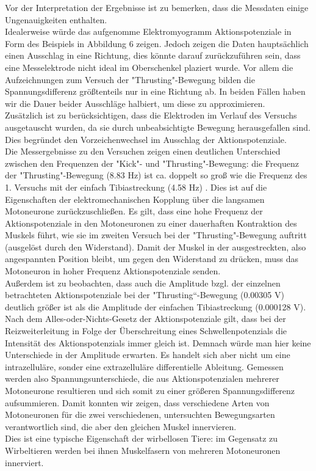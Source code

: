 Vor der Interpretation der Ergebnisse ist zu bemerken, dass die Messdaten einige Ungenauigkeiten enthalten. \\
Idealerweise würde das aufgenomme Elektromyogramm Aktionspotenziale in Form des Beispiels in Abbildung 6 zeigen. Jedoch zeigen die Daten hauptsächlich einen Ausschlag in eine Richtung, dies könnte darauf zurückzuführen sein, dass eine Messelektrode nicht ideal im Oberschenkel plaziert wurde. Vor allem die Aufzeichnungen zum Versuch der "{}Thrusting"{}-Bewegung bilden die Spannungsdifferenz größtenteils nur in eine Richtung ab. In beiden Fällen haben wir die Dauer beider Ausschläge halbiert, um diese zu approximieren. \\
Zusätzlich ist zu berücksichtigen, dass die Elektroden im Verlauf des Versuchs ausgetauscht wurden, da sie durch unbeabsichtigte Bewegung herausgefallen sind. Dies begründet den Vorzeichenwechsel im Ausschlag der Aktionspotenziale.\\

Die Messergebnisse zu den Versuchen zeigen einen deutlichen Unterschied zwischen den Frequenzen der "{}Kick"{}- und "{}Thrusting"{}-Bewegung: die Frequenz der "{}Thrusting"{}-Bewegung (8.83 Hz) ist ca. doppelt so groß wie die Frequenz des 1. Versuchs mit der einfach Tibiastreckung (4.58 Hz) . Dies ist auf die Eigenschaften der elektromechanischen Kopplung über die langsamen Motoneurone zurückzuschließen. Es gilt, dass eine hohe Frequenz der Aktionspotenziale in den Motoneuronen zu einer dauerhaften Kontraktion des Muskels führt, wie sie im zweiten Versuch bei der "{}Thrusting"{}-Bewegung auftritt (ausgelöst durch den Widerstand). Damit der Muskel in der ausgestreckten, also angespannten Position bleibt, um gegen den Widerstand zu drücken, muss das Motoneuron in hoher Frequenz Aktionspotenziale senden.  \\

Außerdem ist zu beobachten, dass auch die Amplitude bzgl. der einzelnen betrachteten Aktionspotenziale bei der "{}Thrusting“{}-Bewegung (0.00305 V) deutlich größer ist als die Amplitude der einfachen Tibiastreckung (0.000128 V). Nach dem Alles-oder-Nichts-Gesetz der Aktionspotenziale gilt, dass bei der Reizweiterleitung in Folge der Überschreitung eines Schwellenpotenzials die Intensität des Aktionspotenzials immer gleich ist. Demnach würde man hier keine Unterschiede in der Amplitude erwarten. Es handelt sich aber nicht um eine intrazelluläre, sonder eine extrazelluläre differentielle Ableitung.  Gemessen werden also Spannungsunterschiede, die aus Aktionspotenzialen mehrerer Motoneurone resultieren und sich somit zu einer größeren Spannungsdifferenz aufsummieren. Damit konnten wir zeigen, dass verschiedene Arten von Motoneuronen für die zwei verschiedenen, untersuchten Bewegungsarten verantwortlich sind, die aber den gleichen Muskel innervieren. \\
Dies ist eine typische Eigenschaft der wirbellosen Tiere: im Gegensatz zu Wirbeltieren werden bei ihnen Muskelfasern von mehreren Motoneuronen innerviert. 


